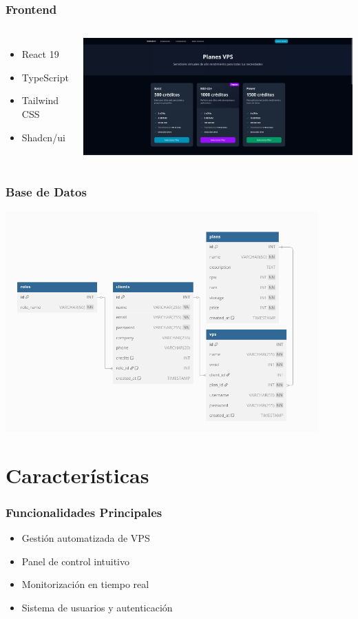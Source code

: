 \documentclass[aspectratio=169]{beamer}
\begin{document}
\begin{frame}
\frametitle{Frontend}
\begin{columns}
\begin{itemize}
    \item React 19
    \item TypeScript
    \item Tailwind CSS
    \item Shadcn/ui
\end{itemize}
\includegraphics[width=\textwidth]{img/captura_web.png}
\end{columns}
\end{frame}

\begin{frame}
\frametitle{Base de Datos}
\centering
\includegraphics[width=0.9\textwidth]{img/esquema_bd.png}
\end{frame}

\section{Características}

\begin{frame}
\frametitle{Funcionalidades Principales}
\begin{itemize}
    \item Gestión automatizada de VPS
    \item Panel de control intuitivo
    \item Monitorización en tiempo real
    \item Sistema de usuarios y autenticación
\end{itemize}
\end{frame}
\end{document}
